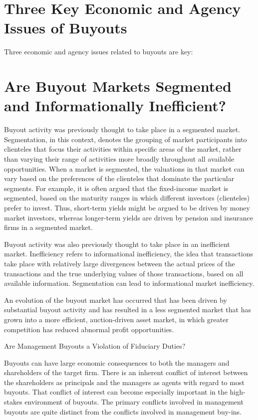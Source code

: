\documentclass[11pt]{article}
\begin{document}
\section*{Three Key Economic and Agency Issues of Buyouts}
Three economic and agency issues related to buyouts are key:

\section*{Are Buyout Markets Segmented and Informationally Inefficient?}
Buyout activity was previously thought to take place in a segmented market. Segmentation, in this context, denotes the grouping of market participants into clienteles that focus their activities within specific areas of the market, rather than varying their range of activities more broadly throughout all available opportunities. When a market is segmented, the valuations in that market can vary based on the preferences of the clienteles that dominate the particular segments. For example, it is often argued that the fixed-income market is segmented, based on the maturity ranges in which different investors (clienteles) prefer to invest. Thus, short-term yields might be argued to be driven by money market investors, whereas longer-term yields are driven by pension and insurance firms in a segmented market.

Buyout activity was also previously thought to take place in an inefficient market. Inefficiency refers to informational inefficiency, the idea that transactions take place with relatively large divergences between the actual prices of the transactions and the true underlying values of those transactions, based on all available information. Segmentation can lead to informational market inefficiency.

An evolution of the buyout market has occurred that has been driven by substantial buyout activity and has resulted in a less segmented market that has grown into a more efficient, auction-driven asset market, in which greater competition has reduced abnormal profit opportunities.

Are Management Buyouts a Violation of Fiduciary Duties?

Buyouts can have large economic consequences to both the managers and shareholders of the target firm. There is an inherent conflict of interest between the shareholders as principals and the managers as agents with regard to most buyouts. That conflict of interest can become especially important in the high-stakes environment of buyouts. The primary conflicts involved in management buyouts are quite distinct from the conflicts involved in management buy-ins.
\end{document}

